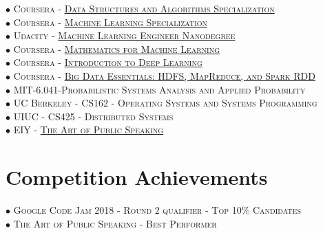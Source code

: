 \documentclass[10pt]{article}
\begin{document}
        $\bullet$ \textsc{Coursera - \href{https://www.coursera.org/account/accomplishments/specialization/certificate/AKFYZQ9QD8XH}{Data Structures and Algorithms Specialization}} \\
        $\bullet$ \textsc{Coursera - \href{https://www.coursera.org/account/accomplishments/specialization/certificate/ZUGAFYKCMQ79}{Machine Learning Specialization}} \\
        $\bullet$ \textsc{Udacity - \href{https://graduation.udacity.com/confirm/HK9JLR3N}{Machine Learning Engineer Nanodegree}} \\
        $\bullet$ \textsc{Coursera - \href{https://www.coursera.org/account/accomplishments/specialization/certificate/N3D6C3DT8QAY?utm_medium=certificate&utm_source=link&utm_campaign=copybutton_certificate}{Mathematics for Machine Learning}} \\
        $\bullet$ \textsc{Coursera - \href{https://www.coursera.org/account/accomplishments/certificate/XN2B7T4AJX8C}{Introduction to Deep Learning}} \\
        $\bullet$ \textsc{Coursera - \href{https://www.coursera.org/account/accomplishments/certificate/G25TQPPNXGW5}{Big Data Essentials: HDFS, MapReduce, and Spark RDD}} \\
        $\bullet$ \textsc{MIT-6.041-Probabilistic Systems Analysis and Applied Probability} \\
        $\bullet$ \textsc{UC Berkeley - CS162 - Operating Systems and Systems Programming} \\
        $\bullet$ \textsc{UIUC - CS425 - Distributed Systems} \\
        $\bullet$ \textsc{EIY - \href{https://drive.google.com/file/d/1oWegGOIsxjOg4SbAEJK8MI1DBeIHGDI8/view}{The Art of Public Speaking}} 

    \vspace{-2mm}
    \section{Competition Achievements}
        \vspace{-2mm}

        $\bullet$ \textsc{Google Code Jam 2018 - Round 2 qualifier - Top 10\% Candidates} \\
        $\bullet$ \textsc{The Art of Public Speaking - Best Performer}
\end{document}
